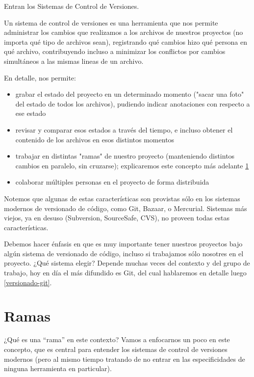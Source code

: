 Entran los Sistemas de Control de Versiones.

Un sistema de control de versiones es una herramienta que nos permite administrar los cambios que realizamos a los archivos de nuestros proyectos (no importa qué tipo de archivos sean), registrando qué cambios hizo qué persona en qué archivo, contribuyendo incluso a minimizar los conflictos por cambios simultáneos a las mismas lineas de un archivo. 

En detalle, nos permite:

\begin{itemize}
  \item grabar el estado del proyecto en un determinado momento ("sacar una foto" del estado de todos los archivos), pudiendo indicar anotaciones con respecto a ese estado

  \item revisar y comparar esos estados a través del tiempo, e incluso obtener el contenido de los archivos en esos distintos momentos

  \item trabajar en distintas "ramas" de nuestro proyecto (manteniendo distintos cambios en paralelo, sin cruzarse); explicaremos este concepto más adelante \ref{versionado-ramas}

  \item colaborar múltiples personas en el proyecto de forma distribuida
\end{itemize}

Notemos que algunas de estas características son provistas sólo en los sistemas modernos de versionado de código, como Git, Bazaar, o Mercurial. Sistemas más viejos, ya en desuso (Subversion, SourceSafe, CVS), no proveen todas estas características.

Debemos hacer énfasis en que es muy importante tener nuestros proyectos bajo algún sistema de versionado de código, incluso si trabajamos sólo nosotres en el proyecto. ¿Qué sistema elegir? Depende muchas veces del contexto y del grupo de trabajo, hoy en día el más difundido es Git, del cual hablaremos en detalle luego \ref{versionado-git}.


\section{Ramas}\label{versionado-ramas}

¿Qué es una ``rama'' en este contexto? Vamos a enfocarnos un poco en este concepto, que es central para entender los sistemas de control de versiones modernos (pero al mismo tiempo tratando de no entrar en las especificidades de ninguna herramienta en particular).

